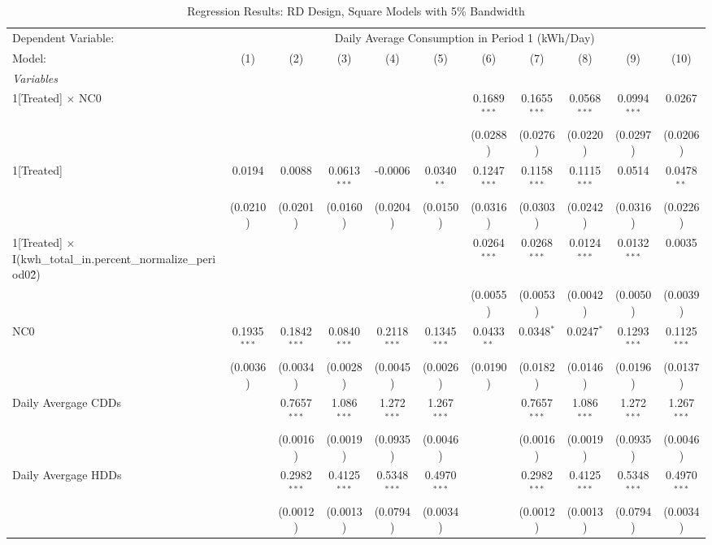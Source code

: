 \begin{table}[htbp]
\centering
\caption{\label{Table:Regression-Results_RD_Square_BW-5} Regression Results: RD Design, Square Models with 5\% Bandwidth}
\begin{tabular}{lcccccccccc}
\tabularnewline\toprule\toprule
Dependent Variable:&\multicolumn{10}{c}{Daily Average Consumption in Period 1 (kWh/Day)}\\
Model:&(1) & (2) & (3) & (4) & (5) & (6) & (7) & (8) & (9) & (10)\\
\midrule
\emph{Variables}&   &   &   &   &   &   &   &   &   &  \\
1[Treated] $\times $ NC0&   &    &    &    &    & 0.1689$^{***}$ & 0.1655$^{***}$ & 0.0568$^{***}$ & 0.0994$^{***}$ & 0.0267\\
  &   &    &    &    &    & (0.0288) & (0.0276) & (0.0220) & (0.0297) & (0.0206)\\
1[Treated]&0.0194 & 0.0088 & 0.0613$^{***}$ & -0.0006 & 0.0340$^{**}$ & 0.1247$^{***}$ & 0.1158$^{***}$ & 0.1115$^{***}$ & 0.0514 & 0.0478$^{**}$\\
  &(0.0210) & (0.0201) & (0.0160) & (0.0204) & (0.0150) & (0.0316) & (0.0303) & (0.0242) & (0.0316) & (0.0226)\\
1[Treated] $\times $ I(kwh\_total\_in.percent\_normalize\_period0\^2)&   &    &    &    &    & 0.0264$^{***}$ & 0.0268$^{***}$ & 0.0124$^{***}$ & 0.0132$^{***}$ & 0.0035\\
  &   &    &    &    &    & (0.0055) & (0.0053) & (0.0042) & (0.0050) & (0.0039)\\
NC0&0.1935$^{***}$ & 0.1842$^{***}$ & 0.0840$^{***}$ & 0.2118$^{***}$ & 0.1345$^{***}$ & 0.0433$^{**}$ & 0.0348$^{*}$ & 0.0247$^{*}$ & 0.1293$^{***}$ & 0.1125$^{***}$\\
  &(0.0036) & (0.0034) & (0.0028) & (0.0045) & (0.0026) & (0.0190) & (0.0182) & (0.0146) & (0.0196) & (0.0137)\\
Daily Avergage CDDs&   & 0.7657$^{***}$ & 1.086$^{***}$ & 1.272$^{***}$ & 1.267$^{***}$ &    & 0.7657$^{***}$ & 1.086$^{***}$ & 1.272$^{***}$ & 1.267$^{***}$\\
  &   & (0.0016) & (0.0019) & (0.0935) & (0.0046) &    & (0.0016) & (0.0019) & (0.0935) & (0.0046)\\
Daily Avergage HDDs&   & 0.2982$^{***}$ & 0.4125$^{***}$ & 0.5348$^{***}$ & 0.4970$^{***}$ &    & 0.2982$^{***}$ & 0.4125$^{***}$ & 0.5348$^{***}$ & 0.4970$^{***}$\\
  &   & (0.0012) & (0.0013) & (0.0794) & (0.0034) &    & (0.0012) & (0.0013) & (0.0794) & (0.0034)\\

\end{tabular}
\end{table}
